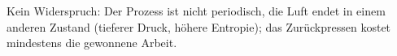Kein Widerspruch: Der Prozess ist nicht periodisch, die Luft endet in einem anderen Zustand (tieferer Druck, höhere Entropie); das Zurückpressen kostet mindestens die gewonnene Arbeit.
